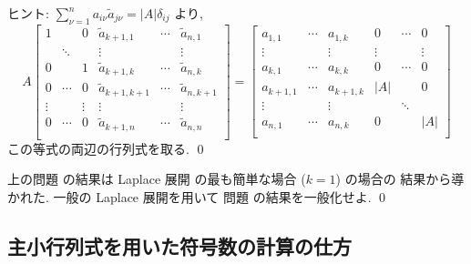 \documentclass[12pt,twoside]{jarticle}
\begin{document}
\medskip
\noindent
ヒント: $\sum_{\nu=1}^n a_{i\nu}\tilde{a}_{j\nu}=|A|\delta_{ij}$ より,
\begin{equation*}
  A
  \begin{bmatrix}
    1      &        & 0      & \tilde{a}_{k+1,1}   & \cdots & \tilde{a}_{n,1} \\
           & \ddots &        & \vdots              &        & \vdots \\
    0      &        & 1      & \tilde{a}_{k+1,k}   & \cdots & \tilde{a}_{n,k} \\
    0      & \cdots & 0      & \tilde{a}_{k+1,k+1} & \cdots & \tilde{a}_{n,k+1} \\
    \vdots &        & \vdots & \vdots              &        & \vdots \\
    0      & \cdots & 0      & \tilde{a}_{k+1,n}   & \cdots & \tilde{a}_{n,n} \\
  \end{bmatrix}
  =
  \begin{bmatrix}
    a_{1,1}   & \cdots & a_{1,k}   &    0   & \cdots & 0 \\
    \vdots    &        & \vdots    & \vdots &        & \vdots \\
    a_{k,1}   & \cdots & a_{k,k}   &    0   & \cdots & 0 \\
    a_{k+1,1} & \cdots & a_{k+1,k} &   |A|  &        & 0 \\
    \vdots    &        & \vdots    &        & \ddots &   \\
    a_{n,1}   & \cdots & a_{n,k}   &    0   &        & |A| \\
  \end{bmatrix}
\end{equation*}
この等式の両辺の行列式を取る.
\qed


\begin{question}
  上の問題  の結果は 
  Laplace 展開  の最も簡単な場合 ($k=1$) の場合の
  結果から導かれた.  一般の Laplace 展開を用いて
  問題  の結果を一般化せよ.  
  \qed
\end{question}


\subsection{主小行列式を用いた符号数の計算の仕方}
\end{document}
